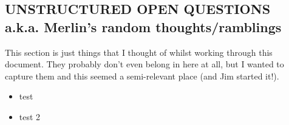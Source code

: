 %
%
%


%





\subsection{UNSTRUCTURED OPEN QUESTIONS \\ a.k.a. Merlin's random thoughts/ramblings}

This section is just things that I thought of whilst working through this document. They probably don't even belong in here at all, but I wanted to capture them and this seemed a semi-relevant place (and Jim started it!).
\begin{itemize}
	\item test
	\item test 2
\end{itemize}





